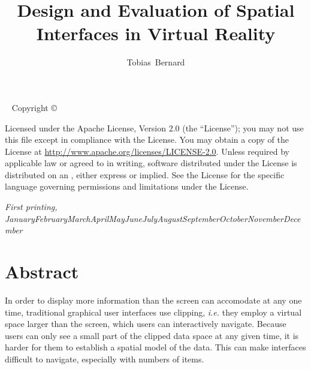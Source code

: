 \documentclass[nobib]{tufte-book} %
\title{Design and Evaluation of Spatial Interfaces in Virtual Reality} %
\author[Tobias Bernard]{Tobias\ Bernard} %
\newcommand{\monthyear}{\ifcase\month\or January\or February\or March\or April\or May\or June\or July\or August\or September\or October\or November\or December\fi\space\number\year} %
\newcommand{\hairsp}{\hspace{1pt}} %
\newcommand{\ie}{\textit{i.\hairsp{}e.}\xspace} %
\begin{document}
\frontmatter



\maketitlepage %


\newpage
\begin{fullwidth}
~\vfill
\thispagestyle{empty}
\setlength{\parindent}{0pt}
\setlength{\parskip}{\baselineskip}
Copyright \copyright\ \the\year\ \thanklessauthor

\par{}

\par{}

\par Licensed under the Apache License, Version 2.0 (the ``License''); you may not use this file except in compliance with the License. You may obtain a copy of the License at \url{http://www.apache.org/licenses/LICENSE-2.0}. Unless required by applicable law or agreed to in writing, software distributed under the License is distributed on an , either express or implied. See the License for the specific language governing permissions and limitations under the License.

\par\textit{First printing, \monthyear}
\end{fullwidth}


\tableofcontents %


\mainmatter


\chapter{Abstract}

In order to display more information than the screen can accomodate at any one time, traditional graphical user interfaces use clipping, \ie they employ a virtual space larger than the screen, which users can interactively navigate. Because users can only see a small part of the clipped data space at any given time, it is harder for them to establish a spatial model of the data. This can make interfaces difficult to navigate, especially with numbers of items.
\end{document}
